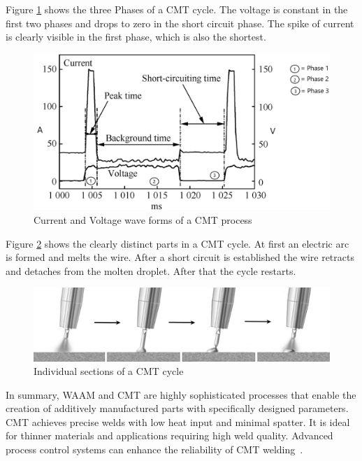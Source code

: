 Figure \ref{fig:CMT} shows the three Phases of a \acrshort{CMT} cycle. The voltage is constant in the first two phases and drops to zero in the short circuit phase. The spike of current is clearly visible in the first phase, which is also the shortest.

\begin{figure}[H]
	\centering
	\includegraphics[width=0.8\linewidth]{figures/CMT.jpg}
	\caption{Current and Voltage wave forms of a CMT process~\cite{Selvi.2018img}}
	\label{fig:CMT}
\end{figure}

\newpage
Figure \ref{fig:CMT2} shows the clearly distinct parts in a \acrshort{CMT} cycle. At first an electric arc is formed and melts the wire. After a short circuit is established  the wire retracts and detaches from the molten droplet. After that the cycle restarts.

\begin{figure}[H]
	\centering
	\includegraphics[width=0.9\linewidth]{figures/CMT2.png}
	\caption{Individual sections of a CMT cycle~\cite{Dalton.30122023}}
	\label{fig:CMT2}
\end{figure}


In summary, \acrshort{WAAM} and \acrshort{CMT} are highly sophisticated processes that enable the creation of additively manufactured parts with specifically designed parameters. \acrshort{CMT} achieves precise welds with low heat input and minimal spatter. It is ideal for thinner materials and applications requiring high weld quality. Advanced process control systems can enhance the reliability of \acrshort{CMT} welding~\cite{Rahul.2018, Pickin.2011}.


